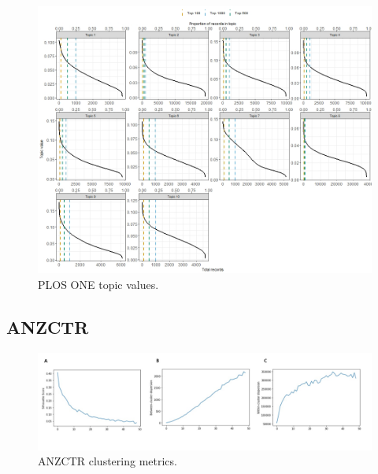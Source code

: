 \documentclass[12pt]{article}
\begin{document}
\begin{figure}

{\centering \includegraphics[width=1\linewidth]{figures/supplementary/plos.topicvalues} 

}

\caption{PLOS ONE topic values.}\label{fig:unnamed-chunk-9}
\end{figure}

\subsection{ANZCTR}

\begin{figure}

{\centering \includegraphics[width=1\linewidth]{figures/supplementary/supp_anzctr.50clusters} 

}

\caption{ANZCTR clustering metrics.}\label{fig:unnamed-chunk-10}
\end{figure}
\end{document}
